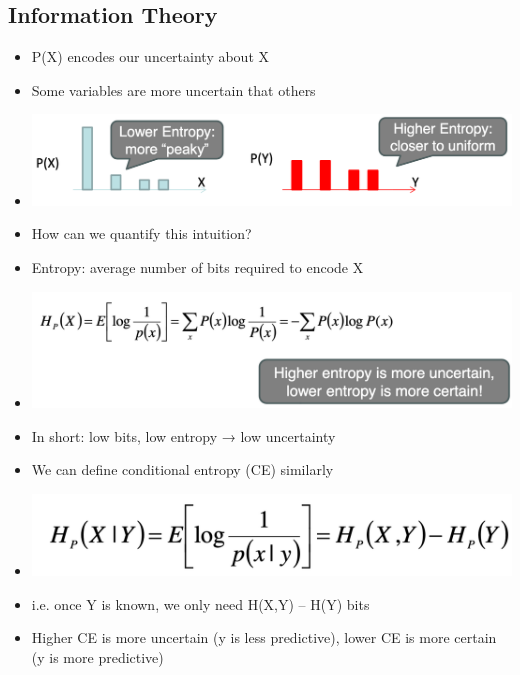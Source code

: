 \documentclass[11pt]{article}
\theoremstyle{definition}
\begin{document}
\subsection{Information Theory}
\begin{itemize}
  \item P(X) encodes our uncertainty about X
  \item Some variables are more uncertain that others
  \item \includegraphics[width=\textwidth/2]{13.png}
  \item How can we quantify this intuition?
  \item Entropy: average number of bits required to encode X
  \item \includegraphics[width=\textwidth/2]{14.png}
  \item In short: low bits, low entropy → low uncertainty
  \item We can define conditional entropy (CE) similarly
  \item \includegraphics[width=\textwidth/2]{15.png}
  \item i.e. once Y is known, we only need H(X,Y) – H(Y) bits
  \item Higher CE is more uncertain (y is less predictive),
  lower CE is more certain (y is more predictive)
\end{itemize}
\end{document}
